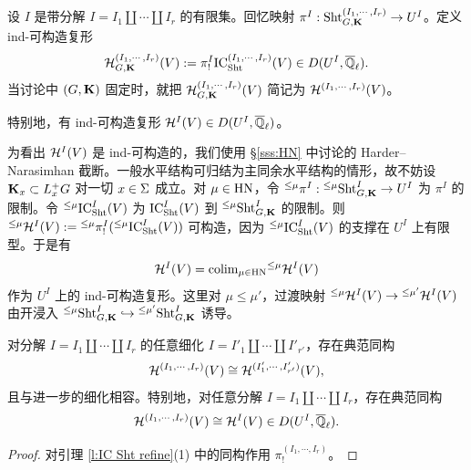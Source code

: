 \begin{dfn} 设 $I$ 是带分解 $I=I_{1}\coprod\cdots \coprod I_{r}$ 的有限集。回忆映射 $\pi^{I}: \textup{Sht}^{(I_{1},\cdots, I_{r})}_{G,\mathbf{K}}\to U^{I}$。定义 ind-可构造复形
\begin{equation*}
\mathcal{H}^{(I_{1},\cdots, I_{r})}_{G,\mathbf{K}}(V):=\pi^{I}_{!}\textup{IC}^{(I_{1},\cdots, I_{r})}_{\textup{Sht}}(V)\in D(U^{I}, \overline{\mathbb{Q}}_\ell).
\end{equation*}
当讨论中 $(G,\mathbf{K})$ 固定时，就把 $\mathcal{H}^{(I_{1},\cdots, I_{r})}_{G,\mathbf{K}}(V)$ 简记为 $\mathcal{H}^{(I_{1},\cdots, I_{r})}(V)$。

特别地，有 ind-可构造复形 $\mathcal{H}^{I}(V)\in D(U^{I}, \overline{\mathbb{Q}}_\ell)$。
\end{dfn}

\begin{rmk}
为看出 $\mathcal{H}^{I}(V)$ 是 ind-可构造的，我们使用 \S\ref{sss:HN} 中讨论的 Harder--Narasimhan 截断。一般水平结构可归结为主同余水平结构的情形，故不妨设 $\mathbf{K}_{x}\subset L^{+}_{x}G$ 对一切 $x\in \Sigma$ 成立。对 $\mu\in \mathrm{HN}$，令 ${}^{\le \mu}\pi^{I}: {}^{\le\mu}\textup{Sht}^{I}_{G,\mathbf{K}}\to U^{I}$ 为 $\pi^{I}$ 的限制。令 ${}^{\le \mu}\textup{IC}_{\textup{Sht}}^{I}(V)$ 为 $\textup{IC}^{I}_{\textup{Sht}}(V)$ 到 ${}^{\le\mu}\textup{Sht}^{I}_{G,\mathbf{K}}$ 的限制。则 ${}^{\le\mu}\mathcal{H}^{I}(V):={}^{\le \mu}\pi^{I}_{!}({}^{\le \mu}\textup{IC}_{\textup{Sht}}^{I}(V))$ 可构造，因为 ${}^{\le \mu}\textup{IC}_{\textup{Sht}}^{I}(V)$ 的支撑在 $U^{I}$ 上有限型。于是有
\begin{equation}\label{HV colim}
\mathcal{H}^{I}(V)=\mathrm{colim}_{\mu\in \mathrm{HN}}{}^{\le\mu}\mathcal{H}^{I}(V)
\end{equation}
作为 $U^{I}$ 上的 ind-可构造复形。这里对 $\mu\le \mu'$，过渡映射 ${}^{\le\mu}\mathcal{H}^{I}(V)\to {}^{\le\mu'}\mathcal{H}^{I}(V)$ 由开浸入 ${}^{\le\mu}\textup{Sht}^{I}_{G,\mathbf{K}}\hookrightarrow {}^{\le\mu'}\textup{Sht}^{I}_{G,\mathbf{K}}$ 诱导。
\end{rmk}

\begin{cor}\label{c:same HV}
对分解 $I=I_{1}\coprod\cdots \coprod I_{r}$ 的任意细化 $I=I'_{1}\coprod\cdots \coprod I'_{r'}$，存在典范同构
\begin{equation*}
\mathcal{H}^{(I_{1},\cdots, I_{r})}(V)\cong \mathcal{H}^{(I'_{1},\cdots, I'_{r'})}(V),
\end{equation*}
且与进一步的细化相容。特别地，对任意分解 $I=I_{1}\coprod\cdots \coprod I_{r}$，存在典范同构
\begin{equation*}
\mathcal{H}^{(I_{1},\cdots ,I_{r})}(V)\cong\mathcal{H}^{I}(V)\in D(U^{I}, \overline{\mathbb{Q}}_\ell).
\end{equation*}
\end{cor}
\begin{proof}
对引理 \ref{l:IC Sht refine}(1) 中的同构作用 $\pi^{(I_{1},\cdots, I_{r})}_{!}$。
\end{proof}

